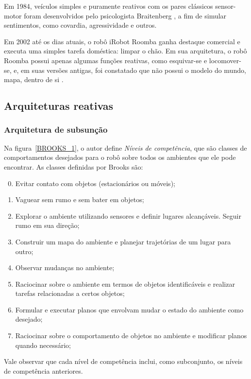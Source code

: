 Em 1984, veículos simples e puramente reativos com os pares clássicos
sensor-motor foram desenvolvidos pelo psicologista Braitenberg
\cite{braitenberg1986vehicles}, a fim de simular sentimentos, como covardia,
agressividade e outros. 

Em 2002 até os dias atuais, o robô iRobot Roomba ganha destaque comercial e
executa uma simples tarefa doméstica: limpar o chão. Em sua arquitetura, o robô
Roomba possui apenas algumas funções reativas, como esquivar-se e locomover-se,
e, em suas versões antigas, foi constatado que não possui o modelo do mundo,
mapa, dentro de si \cite{tribelhorn2007evaluating}.

\subsection{Arquiteturas reativas}


\subsubsection{Arquitetura de subsunção}
Na figura~\ref{BROOKS_1}, o autor define \emph{Níveis de competência}, que são
classes de comportamentos desejados para o robô sobre todos os ambientes que ele
pode encontrar. As classes definidas por Brooks são:
\begin{enumerate}
\setcounter{enumi}{-1}
  \item Evitar contato com objetos (estacionários ou móveis);
  \item Vaguear sem rumo e sem bater em objetos;
  \item Explorar o ambiente utilizando sensores e definir lugares alcançáveis.
  Seguir rumo em sua direção;
  \item Construir um mapa do ambiente e planejar trajetórias de um lugar para
  outro;
  \item Observar mudanças no ambiente;
  \item Raciocinar sobre o ambiente em termos de objetos identificáveis e
  realizar tarefas relacionadas a certos objetos;
  \item Formular e executar planos que envolvam mudar o estado do ambiente como
  desejado;
  \item Raciocinar sobre o comportamento de objetos no ambiente e modificar
  planos quando necessário;
\end{enumerate}

Vale observar que cada nível de competência inclui, como subconjunto, os
níveis de competência anteriores.

